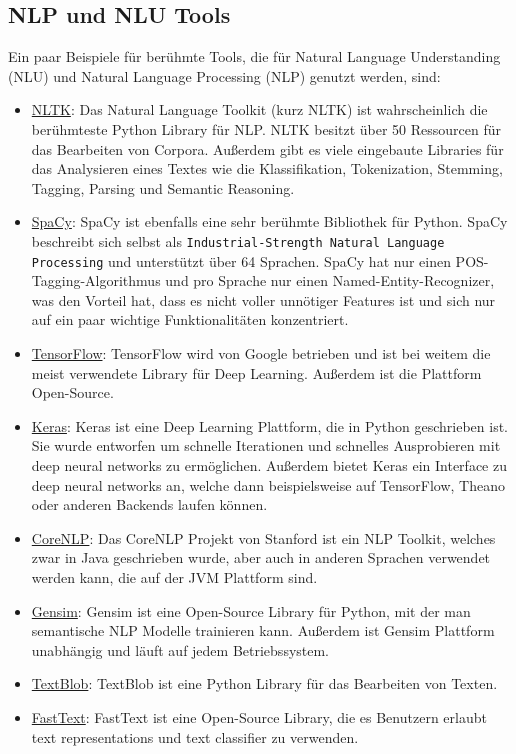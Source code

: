 \subsection{NLP und NLU Tools}

Ein paar Beispiele für berühmte Tools, die für Natural Language Understanding (NLU) und Natural Language Processing (NLP) genutzt werden, sind:

\begin{itemize}
    \item \href{https://www.nltk.org/}{NLTK}: Das Natural Language Toolkit (kurz NLTK) ist wahrscheinlich die berühmteste Python Library für NLP. NLTK besitzt über 50 Ressourcen für das Bearbeiten von Corpora.
    Außerdem gibt es viele eingebaute Libraries für das Analysieren eines Textes wie die Klassifikation, Tokenization, Stemming, Tagging, Parsing und Semantic Reasoning.
    \item \href{https://spacy.io/}{SpaCy}: SpaCy ist ebenfalls eine sehr berühmte Bibliothek für Python.
    SpaCy beschreibt sich selbst als \texttt{Industrial-Strength Natural Language Processing} und unterstützt über 64 Sprachen.
    SpaCy hat nur einen POS-Tagging-Algorithmus und pro Sprache nur einen Named-Entity-Recognizer, was den Vorteil hat, dass es nicht voller unnötiger Features ist und sich nur auf ein paar wichtige Funktionalitäten konzentriert.
    \item \href{https://www.tensorflow.org/}{TensorFlow}: TensorFlow wird von Google betrieben und ist bei weitem die meist verwendete Library für Deep Learning.
    Außerdem ist die Plattform Open-Source.
    \item \href{https://keras.io/}{Keras}: Keras ist eine Deep Learning Plattform, die in Python geschrieben ist.
    Sie wurde entworfen um schnelle Iterationen und schnelles Ausprobieren mit deep neural networks zu ermöglichen.
    Außerdem bietet Keras ein Interface zu deep neural networks an, welche dann beispielsweise auf TensorFlow, Theano oder anderen Backends laufen können.
    \item \href{https://stanfordnlp.github.io/CoreNLP/}{CoreNLP}: Das CoreNLP Projekt von Stanford ist ein NLP Toolkit, welches zwar in Java geschrieben wurde, aber auch in anderen Sprachen verwendet werden kann, die auf der JVM Plattform sind.
    \item \href{https://radimrehurek.com/gensim/}{Gensim}: Gensim ist eine Open-Source Library für Python, mit der man semantische NLP Modelle trainieren kann.
    Außerdem ist Gensim Plattform unabhängig und läuft auf jedem Betriebssystem.
    \item \href{https://textblob.readthedocs.io/en/dev/}{TextBlob}: TextBlob ist eine Python Library für das Bearbeiten von Texten.
    \item \href{https://fasttext.cc/}{FastText}: FastText ist eine Open-Source Library, die es Benutzern erlaubt text representations und text classifier zu verwenden.
\end{itemize}


